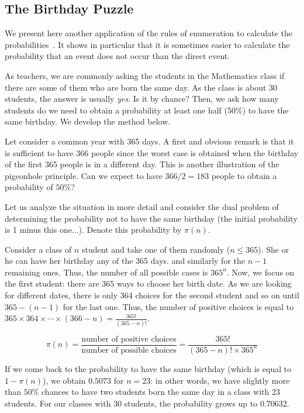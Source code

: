 \subsection{The Birthday Puzzle}
\label{sec:birthday-puzzle}

We present here another application of the rules of enumeration to
calculate the probabilities~\cite{DumasTrystram}.  It shows in
particular that it is sometimes easier to calculate the probability
that an event does not occur than the direct event.

As teachers, we are commonly asking the students in the Mathematics
class if there are some of them who are born the same day.  As the
class is about 30 students, the answer is usually \textit{yes}.  Is it
by chance?  Then, we ask how many students do we need to obtain a
probability at least one half (50\%) to have the same birthday.  We
develop the method below.

\bigskip

Let consider a common year with 365 days.  A first and obvious remark
is that it is sufficient to have 366 people since the worst case is
obtained when the birthday of the first 365 people is in a
different day. This is another illustration of the pigeonhole
principle.  Can we expect to have $366/2 = 183$ people to obtain a
probability of $50\%$?

\bigskip

Let us analyze the situation in more detail and consider the dual
problem of determining the probability not to have the same
birthday (the initial probability is 1 minus this one...).  Denote
this probability by $\pi(n)$.

Consider a class of $n$ student and take one of them randomly ($n \leq
365$).  She or he can have her birthday any of the 365 days.  and
similarly for the $n-1$ remaining ones.  Thus, the number of all
possible cases is $365^n$.  Now, we focus on the first student: there
are 365 ways to choose her birth date.  As we are looking for
different dates, there is only 364 choices for the second student and
so on until $365-(n-1)$ for the last one.  Thus, the number of
positive choices is equal to $365 \times 364 \times \cdots \times
(366-n) = \frac{365!}{(365-n)!}$.

\[ 
\pi(n) = \frac{\mbox{number of positive choices}}{\mbox{number of possible choices}} = \frac{365!}{ (365-n)!  \times 365^n}
\]

If we come back to the probability to have the same birthday (which is
equal to $1-\pi(n)$), we obtain $0.5073$ for $n=23$: in other words,
we have slightly more than $50\%$ chances to have two students born
the same day in a class with 23 students.  For our classes with $30$
students, the probability grows up to $0.70632$.

